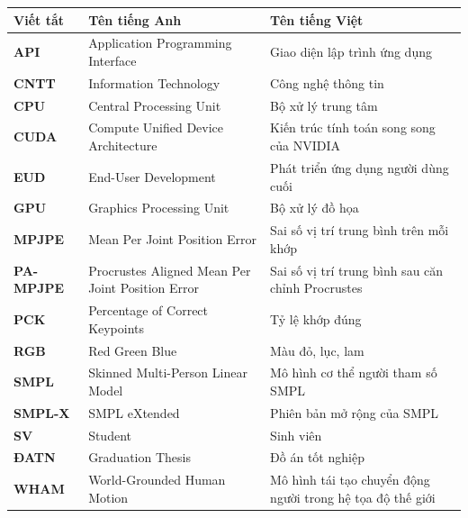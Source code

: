 \documentclass[../DoAn.tex]{subfiles}
\begin{document}
\begin{longtable}{p{2.3cm} p{5.2cm} p{7.2cm}}
	\hline
   \textbf{Viết tắt}  & \textbf{Tên tiếng Anh}	& \textbf{Tên tiếng Việt} \\ \hline 
	\textbf{API} & Application Programming Interface & Giao diện lập trình ứng dụng\\
	\textbf{CNTT} & Information Technology & Công nghệ thông tin\\
	\textbf{CPU} & Central Processing Unit & Bộ xử lý trung tâm\\
	\textbf{CUDA} & Compute Unified Device Architecture & Kiến trúc tính toán song song của NVIDIA\\
	\textbf{EUD} & End-User Development & Phát triển ứng dụng người dùng cuối\\
	\textbf{GPU} & Graphics Processing Unit & Bộ xử lý đồ họa\\
	\textbf{MPJPE} & Mean Per Joint Position Error & Sai số vị trí trung bình trên mỗi khớp\\
	\textbf{PA-MPJPE} & Procrustes Aligned Mean Per Joint Position Error & Sai số vị trí trung bình sau căn chỉnh Procrustes\\
	\textbf{PCK} & Percentage of Correct Keypoints & Tỷ lệ khớp đúng\\
	\textbf{RGB} & Red Green Blue & Màu đỏ, lục, lam\\
	\textbf{SMPL} & Skinned Multi-Person Linear Model & Mô hình cơ thể người tham số SMPL\\
	\textbf{SMPL-X} & SMPL eXtended & Phiên bản mở rộng của SMPL\\
	\textbf{SV} & Student & Sinh viên \\
	\textbf{ĐATN} & Graduation Thesis & Đồ án tốt nghiệp \\
	\textbf{WHAM} & World-Grounded Human Motion & Mô hình tái tạo chuyển động người trong hệ tọa độ thế giới \\

    \hline
\end{longtable}
\end{document}
